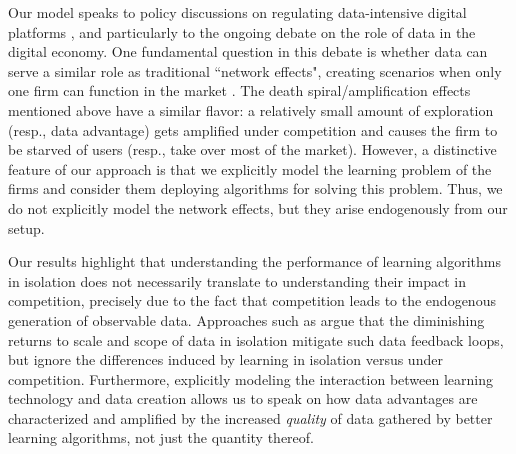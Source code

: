
Our model speaks to policy discussions on regulating data-intensive digital platforms \citep{furman2019unlocking, scott2019committee}, and particularly to the ongoing debate on the role of data in the digital economy. One fundamental question in this debate is whether data can serve a similar role as traditional ``network effects", creating scenarios when only one firm can function in the market \citep{Rysman09, jullien2019economics}.
The death spiral/amplification effects mentioned above have a similar flavor: a relatively small amount of exploration (resp., data advantage)  gets amplified under competition and causes the firm to be starved of users (resp., take over most of the market).
However, a distinctive feature of our approach is that we explicitly model the learning problem of the firms and consider them deploying algorithms for solving this problem.  Thus, we do not explicitly model the network effects, but they arise endogenously from our setup.

Our results highlight that understanding the performance of learning algorithms in isolation does not necessarily translate to understanding their impact in competition, precisely due to the fact that competition leads to the endogenous generation of observable data. Approaches such as \citet{lambrecht2015can, bajari2018impact, varian2018artificial} argue that the diminishing returns to scale and scope of data in isolation mitigate such data feedback loops,
but ignore the differences induced by learning in isolation versus under competition. Furthermore, explicitly modeling the interaction between learning technology and data creation allows us to speak on how data advantages are characterized and amplified by the increased \emph{quality} of data gathered by better learning algorithms, not just the quantity thereof. 

